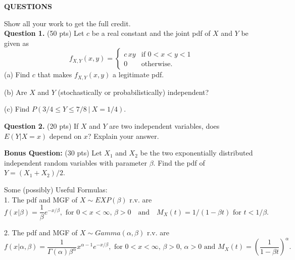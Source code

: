 \documentclass[12pt]{article}
\begin{document}
\pagestyle{fancy}

%

%
%
%
%

\begin{center}
\large{\textbf{QUESTIONS}}
\end{center}
Show all your work to get the full credit.\\
\textbf{Question 1.}  (50 pts)
Let $c$ be a real constant and the joint pdf of $X$ and $Y$ be given as
$$f_{X,Y}(x,y)=
\begin{cases}
    c\,x y & \mbox{if } 0<x<y<1 \\
    0 & \mbox{otherwise}.
  \end{cases}
$$
(a) Find $c$ that makes $f_{X,Y}(x,y)$ a legitimate pdf.
\vspace{4cm}

(b) Are $X$ and $Y$ (stochastically or probabilistically) independent?
\vspace{3cm}

(c) Find $P(3/4 \leq Y \leq 7/8~ |~ X=1/4)$.
\vspace{4cm}

\newpage
\textbf{Question 2.} (20 pts)  If $X$ and $Y$ are two independent variables, does $E(Y|X=x)$ depend on $x$?
Explain your answer.
\vspace{5cm}

\textbf{Bonus Question:} (30 pts)
Let $X_1$ and $X_2$ be the two exponentially distributed independent random variables with parameter $\beta$.
Find the pdf of $Y=(X_1+X_2)/2$.
\vspace{10cm}

Some (possibly) Useful Formulas:\\
1. The pdf and MGF of $X \sim EXP(\beta)$ r.v. are
$$f(x | \beta)=\frac{1}{\beta}e^{-x/\beta}, \text{ for } 0<x<\infty,\, \beta>0
~~~\text{ and }~~~
M_{X}(t)=1/(1-\beta t) \text{ for } t<1/\beta.$$

2. The pdf and MGF of $X \sim Gamma(\alpha, \beta)$ r.v. are
$$f(x |\alpha, \beta)=\frac{1}{\Gamma(\alpha) \beta^{\alpha}} x^{\alpha-1}e^{-x/\beta}, \text{ for } 0<x<\infty,\, \beta>0,\,\alpha>0
\text{ and }M_{X}(t)=\left(\frac{1}{1-\beta t}\right)^{\alpha}.$$

%
%
\end{document}
